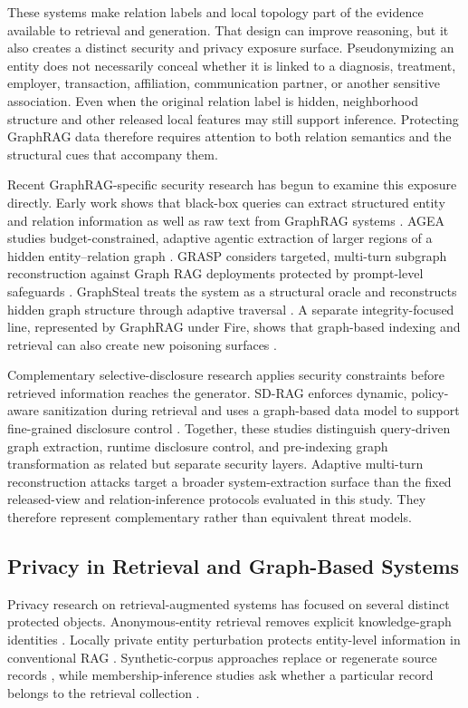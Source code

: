 \documentclass[preprint,12pt]{elsarticle}
\begin{document}
These systems make relation labels and local topology part of the evidence available to retrieval and generation. That design can improve reasoning, but it also creates a distinct security and privacy exposure surface. Pseudonymizing an entity does not necessarily conceal whether it is linked to a diagnosis, treatment, employer, transaction, affiliation, communication partner, or another sensitive association. Even when the original relation label is hidden, neighborhood structure and other released local features may still support inference. Protecting GraphRAG data therefore requires attention to both relation semantics and the structural cues that accompany them.

Recent GraphRAG-specific security research has begun to examine this exposure directly. Early work shows that black-box queries can extract structured entity and relation information as well as raw text from GraphRAG systems \cite{ref22_liu_2026}. AGEA studies budget-constrained, adaptive agentic extraction of larger regions of a hidden entity--relation graph \cite{ref39_yang_2026}. GRASP considers targeted, multi-turn subgraph reconstruction against Graph RAG deployments protected by prompt-level safeguards \cite{ref33_song_2026}. GraphSteal treats the system as a structural oracle and reconstructs hidden graph structure through adaptive traversal \cite{ref08_gu_2026}. A separate integrity-focused line, represented by GraphRAG under Fire, shows that graph-based indexing and retrieval can also create new poisoning surfaces \cite{ref21_liang_2026}.

Complementary selective-disclosure research applies security constraints before retrieved information reaches the generator. SD-RAG enforces dynamic, policy-aware sanitization during retrieval and uses a graph-based data model to support fine-grained disclosure control \cite{ref01_al_masoud_2026}. Together, these studies distinguish query-driven graph extraction, runtime disclosure control, and pre-indexing graph transformation as related but separate security layers. Adaptive multi-turn reconstruction attacks target a broader system-extraction surface than the fixed released-view and relation-inference protocols evaluated in this study. They therefore represent complementary rather than equivalent threat models.

\subsection{Privacy in Retrieval and Graph-Based Systems}
Privacy research on retrieval-augmented systems has focused on several distinct protected objects. Anonymous-entity retrieval removes explicit knowledge-graph identities \cite{ref29_ning_2026}. Locally private entity perturbation protects entity-level information in conventional RAG \cite{ref09_he_2025}. Synthetic-corpus approaches replace or regenerate source records \cite{ref42_zeng_2025}, while membership-inference studies ask whether a particular record belongs to the retrieval collection \cite{ref05_choi_2025,ref12_hu_2022}.
\end{document}
